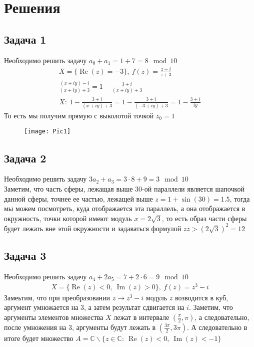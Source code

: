 
\newpage
\section*{Решения}
\subsection*{Задача 1}
	Необходимо решить задачу $a_0 + a_1 = 1 + 7 = 8 \mod 10$
	\begin{gather*}
		X = \{\operatorname{Re}(z) = -3\},\ f(z) = \frac{z - i}{z + 3}\\
		\frac{(x + iy) - i}{(x + iy) + 3} = 1 - \frac{3 + i}{(x + iy) + 3}\\
		X:\ 1 - \frac{3 + i}{(x + iy) + 3} = 1 - \frac{3 + i}{(-3 + iy) + 3} = 1 - \frac{3 + i}{iy}
	\end{gather*}
	То есть мы получим прямую с выколотой точкой $z_0 = 1$
	\begin{figure}[!h]
		\texttt{[image: Pic1]}
	\end{figure}
\vskip 0.4in

\subsection*{Задача 2}
	Необходимо решить задачу $3a_2 + a_3 = 3 \cdot 8 + 9 = 3 \mod 10$\\
	Заметим, что часть сферы, лежащая выше 30-ой параллели является шапочкой данной сферы, точнее ее частью, лежащей выше $z = 1 + \sin(30) = 1.5$, тогда мы можем посмотреть, куда отображается эта параллель, а она отображается в окружность, точки которой имеют модуль $x = 2 \sqrt{3}$, то есть образ части сферы будет лежать вне этой окружности и задаваться формулой $z \overline{z} > (2\sqrt{3})^2 = 12$
\vskip 0.4in

\subsection*{Задача 3}
	Необходимо решить задачу $a_4 + 2a_5 = 7 + 2 \cdot 6 = 9 \mod 10$
	\begin{gather*}
		X = \{\operatorname{Re}(z) < 0,\ \operatorname{Im}(z) > 0\},\ f(z) = z^3 - i
	\end{gather*}
	Замеьтим, что при преобразовании $z \to z^3 - i$ модуль $z$ возводится в куб, аргумент умножается на 3, а затем результат сдвигается на $i$. Заметим, что аргументы элементов множества $X$ лежат в интервале $\left(\frac{\pi}{2}, \pi\right)$, а следовательно, после умножения на 3, аргументы будут лежать в $\left(\frac{3\pi}{2}, 3\pi\right)$. А следовательно в итоге будет множество $A = \mathbb{C} \backslash \{z \in \mathbb{C}:\ \operatorname{Re}(z) < 0,\ \operatorname{Im}(z) < -1\}$
\vskip 0.4in

